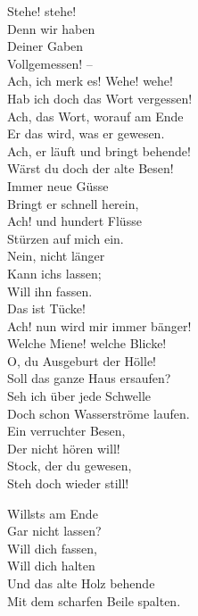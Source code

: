 {		Stehe! stehe! \\
		Denn wir haben \\
		Deiner Gaben \\
		Vollgemessen! – \\ 
		Ach, ich merk es! Wehe! wehe! \\
		Hab ich doch das Wort vergessen! \\
		
		Ach, das Wort, worauf am Ende \\
		Er das wird, was er gewesen. \\
		Ach, er läuft und bringt behende! \\ 
		Wärst du doch der alte Besen! \\
		Immer neue Güsse \\
		Bringt er schnell herein, \\
		Ach! und hundert Flüsse \\
		Stürzen auf mich ein.\\
		
		Nein, nicht länger \\
		Kann ichs lassen; \\
		Will ihn fassen. \\
		Das ist Tücke! \\
		Ach! nun wird mir immer bänger! \\
		Welche Miene! welche Blicke! \\
		
		O, du Ausgeburt der Hölle! \\
		Soll das ganze Haus ersaufen? \\ 
		Seh ich über jede Schwelle \\
		Doch schon Wasserströme laufen. \\
		Ein verruchter Besen, \\
		Der nicht hören will! \\
		Stock, der du gewesen, \\
		Steh doch wieder still! \\
		
		\vfill
		\columnbreak
		
		Willsts am Ende \\
		Gar nicht lassen? \\
		Will dich fassen, \\
		Will dich halten \\
		Und das alte Holz behende \\
		Mit dem scharfen Beile spalten. \\
		
}
